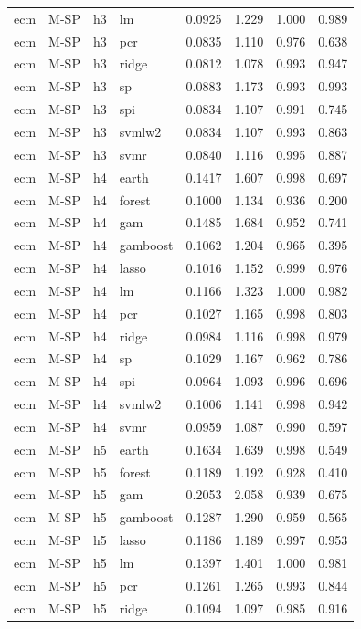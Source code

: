 \begin{ThreePartTable}
\begin{longtable}[t]{llclcccc}
ecm & M-SP & h3 & lm & 0.0925 & 1.229 & 1.000 & 0.989\\
ecm & M-SP & h3 & pcr & 0.0835 & 1.110 & 0.976 & 0.638\\
ecm & M-SP & h3 & ridge & 0.0812 & 1.078 & 0.993 & 0.947\\
ecm & M-SP & h3 & sp & 0.0883 & 1.173 & 0.993 & 0.993\\
ecm & M-SP & h3 & spi & 0.0834 & 1.107 & 0.991 & 0.745\\
ecm & M-SP & h3 & svmlw2 & 0.0834 & 1.107 & 0.993 & 0.863\\
ecm & M-SP & h3 & svmr & 0.0840 & 1.116 & 0.995 & 0.887\\
\addlinespace
ecm & M-SP & h4 & earth & 0.1417 & 1.607 & 0.998 & 0.697\\
ecm & M-SP & h4 & forest & 0.1000 & 1.134 & 0.936 & 0.200\\
ecm & M-SP & h4 & gam & 0.1485 & 1.684 & 0.952 & 0.741\\
ecm & M-SP & h4 & gamboost & 0.1062 & 1.204 & 0.965 & 0.395\\
ecm & M-SP & h4 & lasso & 0.1016 & 1.152 & 0.999 & 0.976\\
ecm & M-SP & h4 & lm & 0.1166 & 1.323 & 1.000 & 0.982\\
ecm & M-SP & h4 & pcr & 0.1027 & 1.165 & 0.998 & 0.803\\
ecm & M-SP & h4 & ridge & 0.0984 & 1.116 & 0.998 & 0.979\\
ecm & M-SP & h4 & sp & 0.1029 & 1.167 & 0.962 & 0.786\\
ecm & M-SP & h4 & spi & 0.0964 & 1.093 & 0.996 & 0.696\\
ecm & M-SP & h4 & svmlw2 & 0.1006 & 1.141 & 0.998 & 0.942\\
ecm & M-SP & h4 & svmr & 0.0959 & 1.087 & 0.990 & 0.597\\
\addlinespace
ecm & M-SP & h5 & earth & 0.1634 & 1.639 & 0.998 & 0.549\\
ecm & M-SP & h5 & forest & 0.1189 & 1.192 & 0.928 & 0.410\\
ecm & M-SP & h5 & gam & 0.2053 & 2.058 & 0.939 & 0.675\\
ecm & M-SP & h5 & gamboost & 0.1287 & 1.290 & 0.959 & 0.565\\
ecm & M-SP & h5 & lasso & 0.1186 & 1.189 & 0.997 & 0.953\\
ecm & M-SP & h5 & lm & 0.1397 & 1.401 & 1.000 & 0.981\\
ecm & M-SP & h5 & pcr & 0.1261 & 1.265 & 0.993 & 0.844\\
ecm & M-SP & h5 & ridge & 0.1094 & 1.097 & 0.985 & 0.916\\

\end{longtable}
\end{ThreePartTable}
